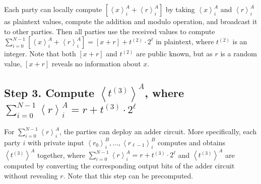 Each party can locally compute $ \left[\left\langle x\right\rangle ^A_i+\left\langle r\right\rangle^A_i\right]    $ by taking $\left\langle x\right\rangle ^A_i$ and $\left\langle r\right\rangle^A_i$ as plaintext values, compute the addition and modulo operation, and broadcast it to other parties. Then all parties use the received values to compute $\sum_{i = 0}^{N-1}\left[ \left\langle x\right\rangle ^A_i+\left\langle r\right\rangle^A_i  \right]  = \left[x+r  \right]   + t^{(2)}\cdot 2^{\ell} $ in plaintext, where $t^{(2)}$ is an integer. Note that both $ \left[x+r \right]  $ and $t^{(2)}$ are public known, but as $r$ is a random value, $ \left[x+r \right]  $ reveals no information about $x$.


\subsection{Step 3. Compute $\left\langle t^{\left(3\right) }\right\rangle^A$, where $\sum_{i = 0}^{N-1}\left\langle r\right\rangle^A_i=r+  t^{\left(3\right) } \cdot 2^{\ell}$}
\label{wrap:step3}

For $\sum_{i = 0}^{N-1}\left\langle r\right\rangle^A_i$, the parties can deploy an adder circuit. More specifically, each party $i$ with private input $ \left\langle r_0\right\rangle^B_i,\ldots,  \left\langle r_{\ell-1}\right\rangle^B_{i} $ computes and obtains $ \left\langle t^{\left(3\right) }\right\rangle^A$ together, where $\sum_{i = 0}^{N-1} \left\langle r \right\rangle ^A_i=r+   t^{\left(3\right) }  \cdot 2^{\ell} $ and $ \left\langle t^{\left(3\right) }\right\rangle^A$ are computed by converting the corresponding output bits of the adder circuit without revealing $r$. Note that this step can be precomputed.

